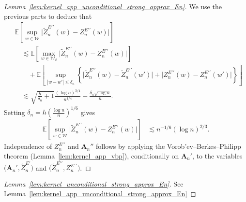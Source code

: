 \documentclass[11pt,lof]{puthesis}
\newcommand{\E}{\ensuremath{\mathbb{E}}}
\newcommand{\bA}{\ensuremath{\mathbf{A}}}
\newcommand{\cW}{\ensuremath{\mathcal{W}}}
\newcommand{\dprime}{\ensuremath{\prime\prime}}
\theoremstyle{break}
\theoremstyle{proof}
\newtheorem{proof}{Proof}
\begin{document}
\begin{proof}[Lemma~\ref{lem:kernel_app_unconditional_strong_approx_En}]
We use the previous parts to deduce that
%
\begin{align*}
&\E\left[
\sup_{w \in \cW}
\big|\tilde Z_n^{E\dprime}(w) - Z_n^{E\dprime}(w)\big|
\right] \\
&\quad\lesssim
\E\left[
\max_{w \in \cW_\delta}
\big|\tilde Z_n^{E\dprime}(w) - Z_n^{E\dprime}(w)\big|
\right] \\
&\qquad+
\E\left[
\sup_{|w-w'| \leq \delta_n}
\left\{
\big|\tilde Z_n^{E\dprime}(w) - \tilde Z_n^{E\dprime}(w')\big|
+ \big|Z_n^{E\dprime}(w) - Z_n^{E\dprime}(w')\big|
\right\}
\right] \\
&\quad\lesssim
\sqrt{\frac{h}{\delta_n} + 1}
\frac{(\log n)^{3/4}}{n^{1/4}}
+ \frac{\delta_n \sqrt{\log n}}{h}.
\end{align*}
%
Setting
$\delta_n = h \left( \frac{\log n}{n} \right)^{1/6}$
gives
%
\begin{align*}
\E\left[
\sup_{w \in \cW}
\big|\tilde Z_n^{E\dprime}(w) - Z_n^{E\dprime}(w)\big|
\right]
&\lesssim
n^{-1/6} (\log n)^{2/3}.
\end{align*}
%
Independence of $Z_n^{E\dprime}$ and $\bA_n''$
follows by applying the
Vorob'ev--Berkes--Philipp theorem (Lemma~\ref{lem:kernel_app_vbp}),
conditionally on $\bA_n'$, to the variables
$\big(\bA_n', \tilde Z_n^{E\prime}\big)$ and
$\big(\tilde Z_n^{E\dprime}, Z_n^{E\dprime}\big)$.
\end{proof}

\begin{proof}[Lemma~\ref{lem:kernel_unconditional_strong_approx_En}]
See Lemma~\ref{lem:kernel_app_unconditional_strong_approx_En}
\end{proof}
\end{document}
